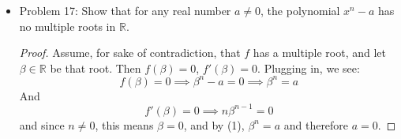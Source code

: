 \documentclass[hidelinks,12pt]{article}
\newcommand{\R}{\mathbb{R}}
\begin{document}
\begin{itemize}
    \item Problem 17: Show that for any real number $a\neq0$, the polynomial $x^n-a$ has no multiple roots in $\R$.\begin{proof}
    Assume, for sake of contradiction, that $f$ has a multiple root, and let $\beta\in\R$ be that root. Then $f\left(\beta\right)=0$, $f'\left(\beta\right)=0$. Plugging in, we see:\setcounter{equation}{0}\begin{equation}f\left(\beta\right)=0\implies \beta^n-a=0\implies \beta^n=a\end{equation} And \begin{equation}f'\left(\beta\right)=0\implies n\beta^{n-1}=0\end{equation} and since $n\neq0$, this means $\beta=0$, and by (1), $\beta^n=a$ and therefore $a=0$. {\Large\Lightning}
    \end{proof}
\end{itemize}
\end{document}
